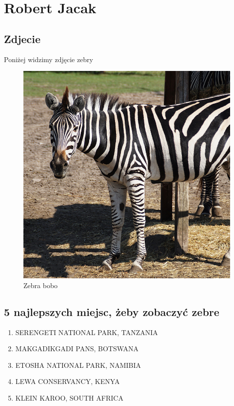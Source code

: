 \section{Robert Jacak}
\label{sec:RobertJacak}

\subsection{Zdjecie}
\centering Poniżej widzimy zdjęcie zebry
\begin{figure}[htbt]
    \centering
    \includegraphics [scale=0.3]{pictures/zebra.jpg}
    \caption{Zebra bobo}
    \label{fig:zebra}
\end{figure}
\subsection{5 najlepszych miejsc, żeby zobaczyć zebre}
\begin{enumerate}
    \item SERENGETI NATIONAL PARK, TANZANIA
    \item MAKGADIKGADI PANS, BOTSWANA
    \item ETOSHA NATIONAL PARK, NAMIBIA
    \item LEWA CONSERVANCY, KENYA
    \item KLEIN KAROO, SOUTH AFRICA
\end{enumerate}
